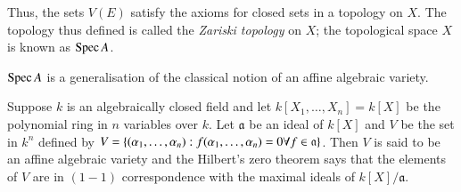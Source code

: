 Thus, the sets $V(E)$ satisfy the axioms for closed sets in a topology
on $X$. The topology thus defined is called the {\em Zariski topology}
on $X$; the topological space $X$ is known as $\operatorname{Spec} A$.

\begin{note*}
$\operatorname{Spec} A$ is a generalisation of the classical notion of an affine
  algebraic variety.
\end{note*}

Suppose $k$ is an algebraically closed field and let
$k[X_{1},\ldots,X_{n}]=k[X]$ be the polynomial ring in $n$ variables
over $k$. Let $\mathfrak{a}$ be an ideal of $k[X]$ and $V$ be the set
in $k^{n}$ defined by
$V=\{(\alpha_{1},\ldots,\alpha_{n}):f(\alpha_{1},\ldots,\alpha_{n})\break
=0\forall
f\in \mathfrak{a}\}$. Then $V$ is said to be an affine algebraic
variety and the Hilbert's zero theorem says that the elements of $V$
are in $(1-1)$ correspondence with the maximal ideals of
$k[X]/\mathfrak{a}$.

